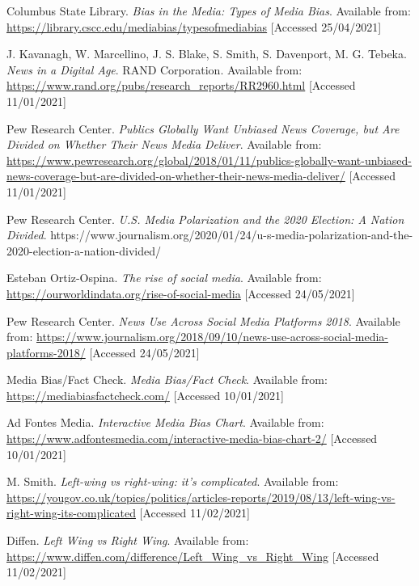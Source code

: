 \begin{thebibliography}{9}

Columbus State Library. \textit{Bias in the Media: Types of Media Bias}. Available from: \url{https://library.cscc.edu/mediabias/typesofmediabias} [Accessed 25/04/2021]

J. Kavanagh, W. Marcellino, J. S. Blake, S. Smith, S. Davenport, M. G. Tebeka. \textit{News in a Digital Age}. RAND Corporation. Available from: \url{https://www.rand.org/pubs/research\_reports/RR2960.html} [Accessed 11/01/2021]

Pew Research Center. \textit{Publics Globally Want Unbiased News Coverage, but Are Divided on Whether Their News Media Deliver}. Available from: \url{https://www.pewresearch.org/global/2018/01/11/publics-globally-want-unbiased-news-coverage-but-are-divided-on-whether-their-news-media-deliver/} [Accessed 11/01/2021]

Pew Research Center. \textit{U.S. Media Polarization and the 2020 Election: A Nation Divided}. 
https://www.journalism.org/2020/01/24/u-s-media-polarization-and-the-2020-election-a-nation-divided/

Esteban Ortiz-Ospina. \textit{The rise of social media}. Available from: \url{https://ourworldindata.org/rise-of-social-media} [Accessed 24/05/2021]

Pew Research Center. \textit{News Use Across Social Media Platforms 2018}. Available from: \url{https://www.journalism.org/2018/09/10/news-use-across-social-media-platforms-2018/} [Accessed 24/05/2021]

Media Bias/Fact Check. \textit{Media Bias/Fact Check}. Available from: \url{https://mediabiasfactcheck.com/} [Accessed 10/01/2021]

Ad Fontes Media. \textit{Interactive Media Bias Chart}. Available from: \url{https://www.adfontesmedia.com/interactive-media-bias-chart-2/} [Accessed 10/01/2021]

M. Smith. \textit{Left-wing vs right-wing: it’s complicated}. Available from: 
\url{https://yougov.co.uk/topics/politics/articles-reports/2019/08/13/left-wing-vs-right-wing-its-complicated} [Accessed 11/02/2021]

Diffen. \textit{Left Wing vs Right Wing}. Available from: \url{https://www.diffen.com/difference/Left_Wing_vs_Right_Wing} [Accessed 11/02/2021]


\end{thebibliography}
